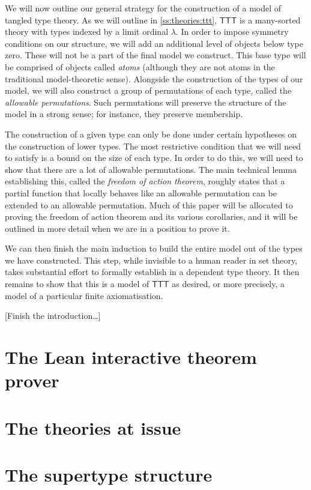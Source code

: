 \documentclass{article}
\theoremstyle{definition}
\theoremstyle{remark}
\begin{document}
We will now outline our general strategy for the construction of a model of tangled type theory.
As we will outline in \cref{ss:theories:ttt}, \( \mathsf{TTT} \) is a many-sorted theory with types indexed by a limit ordinal \( \lambda \).
In order to impose symmetry conditions on our structure, we will add an additional level of objects below type zero.
These will not be a part of the final model we construct.
This base type will be comprised of objects called \emph{atoms} (although they are not atoms in the traditional model-theoretic sense).
Alongside the construction of the types of our model, we will also construct a group of permutations of each type, called the \emph{allowable permutations}.
Such permutations will preserve the structure of the model in a strong sense; for instance, they preserve membership.

The construction of a given type can only be done under certain hypotheses on the construction of lower types.
The most restrictive condition that we will need to satisfy is a bound on the size of each type.
In order to do this, we will need to show that there are a lot of allowable permutations.
The main technical lemma establishing this, called the \emph{freedom of action theorem}, roughly states that a partial function that locally behaves like an allowable permutation can be extended to an allowable permutation.
Much of this paper will be allocated to proving the freedom of action theorem and its various corollaries, and it will be outlined in more detail when we are in a position to prove it.

We can then finish the main induction to build the entire model out of the types we have constructed.
This step, while invisible to a human reader in set theory, takes substantial effort to formally establish in a dependent type theory.
It then remains to show that this is a model of \( \mathsf{TTT} \) as desired, or more precisely, a model of a particular finite axiomatisation.

[Finish the introduction\dots]


\section{The Lean interactive theorem prover}
\label{s:lean}


\section{The theories at issue}
\label{s:theories}


\section{The supertype structure}
\label{s:structure}


\printbibliography
\end{document}
